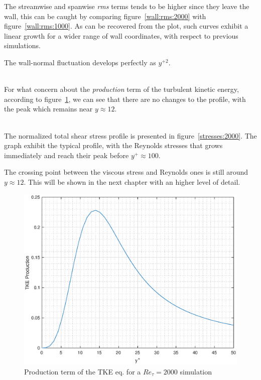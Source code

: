The streamwise and spanwise \emph{rms} terms tends to be higher since they leave the wall, this can be caught by comparing figure~\ref{wall:rms:2000} with figure~\ref{wall:rms:1000}. As can be recovered from the plot, such curves exhibit a linear growth for a wider range of wall coordinates, with respect to previous simulations. \par
The wall-normal fluctuation develops perfectly as $y^{+2}$.\\~\par


For what concern about the \emph{production} term of the turbulent kinetic energy, according to figure~\ref{tke:prod:2000}, we can see that there are no changes to the profile, with the peak which remains near $y\approx12$. \\~\par

The normalized total shear stress profile is presented in figure~\ref{stresses:2000}. The graph exhibit the typical profile, with the Reynolds stresses that grows immediately and reach their peak before $y^{+}\approx 100$. \par
The crossing point between the viscous stress and Reynolds ones is still around $y\approx12$. This will be shown in the next chapter with an higher level of detail.


\begin{figure}
\begin{center}
\includegraphics[scale=0.55]{grafici/tke_prod_2000.eps}
\caption{Production term of the TKE eq. for a $Re_{\tau}=2000$ simulation}
\label{tke:prod:2000}
\end{center} 
\end{figure}

